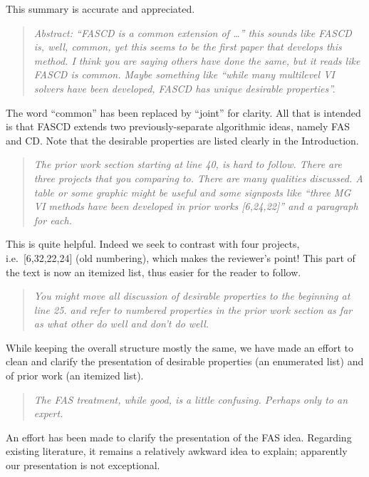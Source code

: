 \documentclass[letterpaper,final,12pt,reqno]{amsart}
\newenvironment{review}%
{\bigskip \par \begin{quote} \selectfont \sl}%
{\end{quote}}
\newcommand\short[1]{\medskip\noindent #1}   %
\begin{document}
\short{This summary is accurate and appreciated.}

\begin{review}
Abstract: ``FASCD is a common extension of \dots'' this sounds like FASCD is, well, common, yet this seems to be the first paper that develops this method.  I think you are saying others have done the same, but it reads like FASCD is common.  Maybe something like ``while many multilevel VI solvers have been developed, FASCD has unique desirable properties''.
\end{review}

\short{The word ``common'' has been replaced by ``joint'' for clarity.  All that is intended is that FASCD extends two previously-separate algorithmic ideas, namely FAS and CD.  Note that the desirable properties are listed clearly in the Introduction.}

\begin{review}
The prior work section starting at line 40, is hard to follow.  There are three projects that you comparing to.  There are many qualities discussed.  A table or some graphic might be useful and some signposts like ``three MG VI methods have been developed in prior works [6,24,22]'' and a paragraph for each.
\end{review}

\short{This is quite helpful.  Indeed we seek to contrast with four projects, i.e.~[6,32,22,24] (old numbering), which makes the reviewer's point!  This part of the text is now an itemized list, thus easier for the reader to follow.}

\begin{review}
You might move all discussion of desirable properties to the beginning at line 25. and refer to numbered properties in the prior work section as far as what other do well and don't do well.
\end{review}

\short{While keeping the overall structure mostly the same, we have made an effort to clean and clarify the presentation of desirable properties (an enumerated list) and of prior work (an itemized list).}

\begin{review}
The FAS treatment, while good, is a little confusing.  Perhaps only to an expert.
\end{review}

\short{An effort has been made to clarify the presentation of the FAS idea.  Regarding existing literature, it remains a relatively awkward idea to explain; apparently our presentation is not exceptional.}
\end{document}
